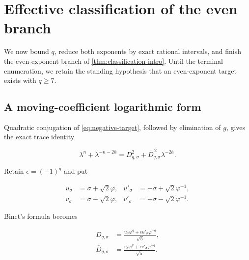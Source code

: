 %
%
\section{Effective classification of the even branch}
\label{sec:classification}

We now bound $q$, reduce both exponents by exact rational intervals, and
finish the even-exponent branch of \cref{thm:classification-intro}.
Until the terminal enumeration, we retain the standing hypothesis that an
even-exponent target exists with $q\geqslant7$.

\subsection{A moving-coefficient logarithmic form}

Quadratic conjugation of \cref{eq:negative-target}, followed by elimination
of $g$, gives the exact trace identity

\begin{equation}
 \lambda^n+\lambda^{-n-2h}
 =D_{q,\sigma}^2+\overline{D}_{q,\sigma}^{\,2}\lambda^{-2h}.
 \label{eq:trace-identity}
\end{equation}

Retain $\epsilon=(-1)^q$ and put

\begin{equation}
 \begin{aligned}
 u_\sigma&=\sigma+\sqrt2\varphi,
 &u'_\sigma&=-\sigma+\sqrt2\varphi^{-1},\\
 v_\sigma&=\sigma-\sqrt2\varphi,
 &v'_\sigma&=-\sigma-\sqrt2\varphi^{-1}.
 \end{aligned}
 \label{eq:four-coefficients}
\end{equation}

Binet's formula becomes

\begin{equation}
 \begin{aligned}
 D_{q,\sigma}
 &=\frac{u_\sigma\varphi^q+\epsilon u'_\sigma\varphi^{-q}}{\sqrt5},\\
 \overline D_{q,\sigma}
 &=\frac{v_\sigma\varphi^q+\epsilon v'_\sigma\varphi^{-q}}{\sqrt5}.
 \end{aligned}
 \label{eq:two-binet}
\end{equation}

